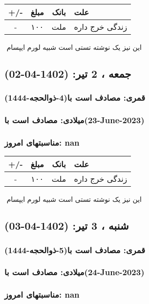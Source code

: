\documentclass{article}
\newcommand{\rnote}[1]{\marginpar{\textcolor{color}{\StrSubstitute{\##1}{ }{\_}}}}
\newcommand{\myRow}[4]{
    #1 & #2 & #3 & #4 \\ \hline
}
\begin{document}
\begin{tabular}{ | c | c | c | p{5cm} |}
    \hline
    \myRow{ +/- }{مبلغ}{بانک}{علت}
    \myRow{-}{۱۰۰}{ملت}{زندگی خرج داره}
\end{tabular}
\newline
\newline

‌
\rnote{تست}
این نیز یک نوشته تستی است شبیه لورم ایپسام




\newpage
{}
\textcolor{color}{
\section{ جمعه ، 2 تیر: (1402-04-02) }
\subsubsection*{قمری: مصادف است با(4-ذوالحجه-1444)} 
\subsubsection*{میلادی: مصادف است با(23-June-2023)}
\subsubsection*{مناسبتهای امروز: nan}
}


\begin{tabular}{ | c | c | c | p{5cm} |}
    \hline
    \myRow{ +/- }{مبلغ}{بانک}{علت}
    \myRow{-}{۱۰۰}{ملت}{زندگی خرج داره}
\end{tabular}
\newline
\newline

‌
\rnote{تست}
این نیز یک نوشته تستی است شبیه لورم ایپسام




\newpage
{}
\textcolor{color}{
\section{ شنبه ، 3 تیر: (1402-04-03) }
\subsubsection*{قمری: مصادف است با(5-ذوالحجه-1444)} 
\subsubsection*{میلادی: مصادف است با(24-June-2023)}
\subsubsection*{مناسبتهای امروز: nan}
}
\end{document}

